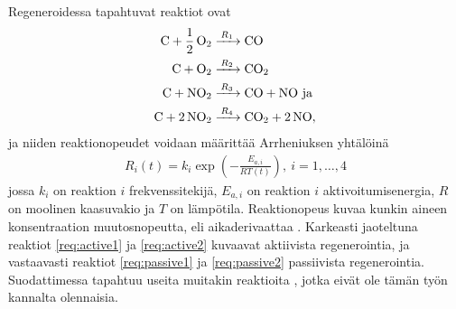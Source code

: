 Regeneroidessa tapahtuvat reaktiot ovat  
\begin{align}
    \ce{C + 1/2 O2 &->[$R_1$] CO }    \label{req:active1}\\
    \ce{C + O2 &->[$R_2$] CO2}    \label{req:active2}\\
    \ce{C + NO2 &->[$R_3$] CO +  NO} \text{ ja }  \label{req:passive1} \\
    \ce{C + 2 NO2 &->[$R_4$] CO2 + 2 NO},    \label{req:passive2} 
\end{align}
ja niiden reaktionopeudet voidaan määrittää Arrheniuksen yhtälöinä \cite{LiuGuanlin2021Roio} \cite{Penghao_regen}
\begin{align}
    R_i(t) =  k_i \exp\left({-\frac{E_{a,i}}{RT(t)}}\right),\ i = 1,\ldots,4
\end{align}
jossa \(k_i\) on reaktion \(i\) frekvenssitekijä, \(E_{a, i}\) on  reaktion \(i\) aktivoitumisenergia, \(R\) on moolinen kaasuvakio ja \(T\) on lämpötila. 
Reaktionopeus kuvaa kunkin aineen konsentraation muutosnopeutta, eli aikaderivaattaa \cite[s. 24-26]{chemical_reaction_kinetics}. Karkeasti jaoteltuna reaktiot \eqref{req:active1} ja \eqref{req:active2} kuvaavat aktiivista regenerointia, ja vastaavasti reaktiot \eqref{req:passive1} ja \eqref{req:passive2} passiivista regenerointia.
Suodattimessa tapahtuu useita muitakin reaktioita \cite{Penghao_regen}, jotka eivät ole tämän työn kannalta olennaisia.

